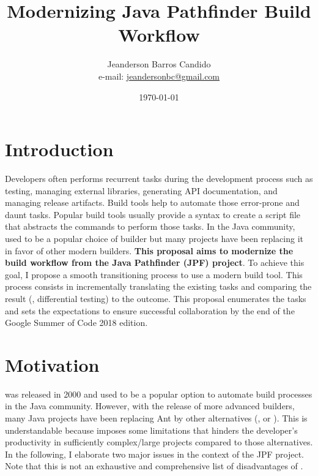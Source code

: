 \documentclass[a4paper, 12pt]{article}
\author{Jeanderson Barros Candido\\e-mail: \url{jeandersonbc@gmail.com}}
\title{Modernizing Java Pathfinder Build Workflow}
\date{\today}
\begin{document}
\maketitle

\section*{Introduction}

Developers often performs recurrent tasks during the development process such
as testing, managing external libraries, generating API documentation, and
managing release artifacts.
Build tools help to automate those error-prone and daunt tasks.
Popular build tools usually provide a syntax to create a script file that
abstracts the commands to perform those tasks.
In the Java community, \ant{} used to be a popular choice of builder but many
projects have been replacing it in favor of other modern builders.
\textbf{This proposal aims to modernize the build workflow from the Java
Pathfinder (JPF) project}.
To achieve this goal, I propose a smooth transitioning process to use a modern
build tool.
This process consists in incrementally translating the existing \ant{} tasks
and comparing the result (\ie, differential testing) to the \ant{} outcome.
This proposal enumerates the tasks and sets the expectations to ensure
successful collaboration by the end of the Google Summer of Code 2018 edition.

\section{Motivation}
\label{sec:motivation}

\ant{} was released in 2000 and used to be a popular option to automate
build processes in the Java community.
However, with the release of more advanced builders, many Java projects have
been replacing Ant by other alternatives (\eg, \gradle{} or \maven{}).
This is understandable because \ant{} imposes some limitations that hinders the
developer's productivity in sufficiently complex/large projects compared to
those alternatives.
In the following, I elaborate two major issues in the context of the JPF
project.
Note that this is not an exhaustive and comprehensive list of disadvantages of
\ant{}.
\end{document}
